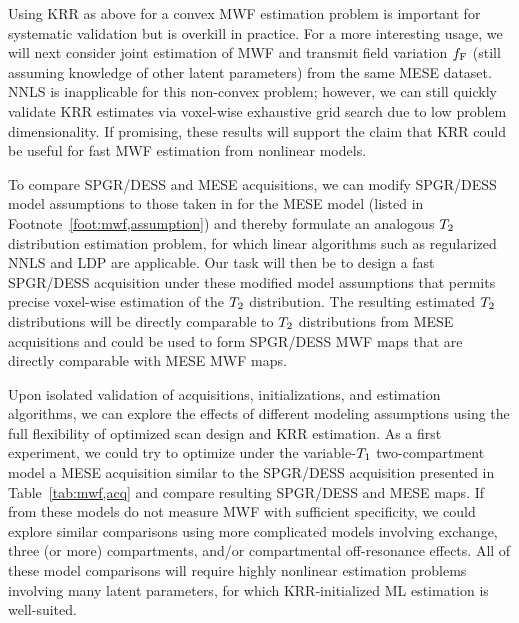 Using KRR as above
for a convex MWF estimation problem 
is important for systematic validation
but is overkill in practice.
For a more interesting usage,
we will next consider joint estimation
of MWF and transmit field variation $f_{\mathrm{F}}$
(still assuming knowledge of other latent parameters)
from the same MESE dataset.
NNLS is inapplicable 
for this non-convex problem;
however, 
we can still quickly validate KRR estimates 
via voxel-wise exhaustive grid search
due to low problem dimensionality.
If promising,
these results will support the claim
that KRR could be useful 
for fast \invivo MWF estimation 
from nonlinear models.

To compare SPGR/DESS and MESE acquisitions,
we can modify SPGR/DESS model assumptions
to those taken in \cite{prasloski:12:rwc}
for the MESE model
(listed in Footnote~\ref{foot:mwf,assumption})
and thereby formulate an analogous
$T_2$ distribution estimation problem,
for which linear algorithms 
such as regularized NNLS and LDP are applicable.
Our task will then be 
to design a fast SPGR/DESS acquisition
under these modified model assumptions
that permits precise voxel-wise estimation 
of the $T_2$ distribution.
The resulting estimated $T_2$ distributions
will be directly comparable 
to $T_2$ distributions 
from MESE acquisitions
and could be used
to form SPGR/DESS MWF maps
that are directly comparable 
with MESE MWF maps.

Upon isolated validation
of acquisitions, initializations, and estimation algorithms,
we can explore the effects 
of different modeling assumptions
using the full flexibility
of optimized scan design and KRR estimation.
As a first experiment,
we could try to optimize
under the variable-$T_1$ two-compartment model 
a MESE acquisition
similar to the SPGR/DESS acquisition 
presented in Table~\ref{tab:mwf,acq}
and compare resulting SPGR/DESS and MESE \ffest maps. 
If \ffest from these models do not measure MWF
with sufficient specificity,
we could explore similar comparisons
using more complicated models
involving exchange, three (or more) compartments,
and/or compartmental off-resonance effects.
All of these model comparisons 
will require highly nonlinear estimation problems
involving many latent parameters,
for which KRR-initialized ML estimation is well-suited.

